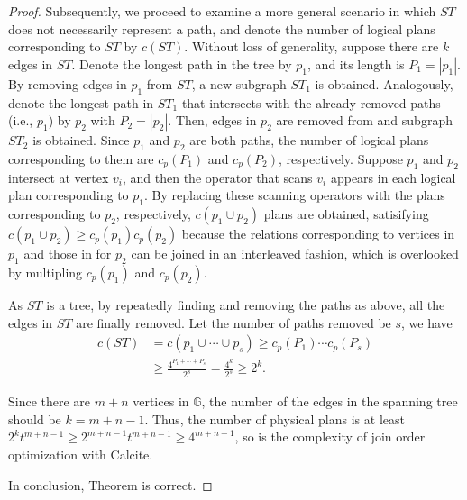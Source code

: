 \begin{proof}
    Subsequently, we proceed to examine a more general scenario in which $ST$ does not necessarily represent a path, and denote the number of logical plans corresponding to $ST$ by $c(ST)$.
    Without loss of generality, suppose there are $k$ edges in $ST$. 
    Denote the longest path in the tree by $p_1$, and its length is $P_1 = |p_1|$.
    By removing edges in $p_1$ from $ST$, a new subgraph $ST_1$ is obtained.
    Analogously, denote the longest path in $ST_1$ that intersects with the already removed paths (i.e., $p_1$) by $p_2$ with $P_2 = |p_2|$.
    Then, edges in $p_2$ are removed from and subgraph $ST_2$ is obtained.
    Since $p_1$ and $p_2$ are both paths, the number of logical plans corresponding to them are $c_p(P_1)$ and $c_p(P_2)$, respectively.
    Suppose $p_1$ and $p_2$ intersect at vertex $v_i$, and then the operator that scans $v_i$ appears in each logical plan corresponding to $p_1$.
    By replacing these scanning operators with the plans corresponding to $p_2$, respectively, $c(p_1 \cup p_2)$ plans are obtained, satisifying $c(p_1 \cup p_2) \geq c_p(p_1)c_p(p_2)$ because the relations corresponding to vertices in $p_1$ and those in for $p_2$ can be joined in an interleaved fashion, which is overlooked by multipling $c_p(p_1)$ and $c_p(p_2)$.

    As $ST$ is a tree, by repeatedly finding and removing the paths as above, all the edges in $ST$ are finally removed.
    Let the number of paths removed be $s$, we have
    \begin{equation*}
        \begin{split}
            c(ST) & = c(p_1 \cup \cdots \cup p_s) \geq c_p(P_1) \cdots c_p(P_s) \\
            & \geq \frac{4^{P_1 + \cdots + P_s}}{2^s} = \frac{4^{k}}{2^s} \geq 2^{k}.
        \end{split}
    \end{equation*}


    Since there are $m + n$ vertices in $\mathbb{G}$, the number of the edges in the spanning tree should be $k = m + n - 1$.
    Thus, the number of physical plans is at least $2^{k}t^{m+n-1} \geq 2^{m+n-1}t^{m+n-1} \geq 4^{m+n-1}$, so is the complexity of join order optimization with Calcite.

    In conclusion, Theorem  is correct.
\end{proof}


